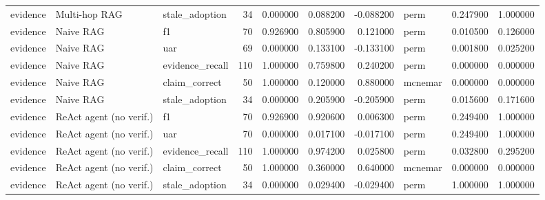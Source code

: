 \begin{table}
\begin{tabular}{lllrrrrlrr}
evidence & Multi-hop RAG & stale\_adoption & 34 & 0.000000 & 0.088200 & -0.088200 & perm & 0.247900 & 1.000000 \\
evidence & Naive RAG & f1 & 70 & 0.926900 & 0.805900 & 0.121000 & perm & 0.010500 & 0.126000 \\
evidence & Naive RAG & uar & 69 & 0.000000 & 0.133100 & -0.133100 & perm & 0.001800 & 0.025200 \\
evidence & Naive RAG & evidence\_recall & 110 & 1.000000 & 0.759800 & 0.240200 & perm & 0.000000 & 0.000000 \\
evidence & Naive RAG & claim\_correct & 50 & 1.000000 & 0.120000 & 0.880000 & mcnemar & 0.000000 & 0.000000 \\
evidence & Naive RAG & stale\_adoption & 34 & 0.000000 & 0.205900 & -0.205900 & perm & 0.015600 & 0.171600 \\
evidence & ReAct agent (no verif.) & f1 & 70 & 0.926900 & 0.920600 & 0.006300 & perm & 0.249400 & 1.000000 \\
evidence & ReAct agent (no verif.) & uar & 70 & 0.000000 & 0.017100 & -0.017100 & perm & 0.249400 & 1.000000 \\
evidence & ReAct agent (no verif.) & evidence\_recall & 110 & 1.000000 & 0.974200 & 0.025800 & perm & 0.032800 & 0.295200 \\
evidence & ReAct agent (no verif.) & claim\_correct & 50 & 1.000000 & 0.360000 & 0.640000 & mcnemar & 0.000000 & 0.000000 \\
evidence & ReAct agent (no verif.) & stale\_adoption & 34 & 0.000000 & 0.029400 & -0.029400 & perm & 1.000000 & 1.000000 \\
\bottomrule
\end{tabular}
\end{table}
